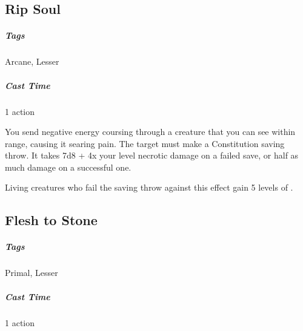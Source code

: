 

\subsection{Rip Soul}
\subparagraph*{Tags} Arcane, Lesser
\subparagraph*{Cast Time} 1 action

You send negative energy coursing through a creature that you can see within range, causing it searing pain. The target must make a Constitution saving throw. It takes 7d8 + 4x your level necrotic damage on a failed save, or half as much damage on a successful one.

Living creatures who fail the saving throw against this effect gain 5 levels of .









\subsection{Flesh to Stone}
\subparagraph*{Tags} Primal, Lesser
\subparagraph*{Cast Time} 1 action

